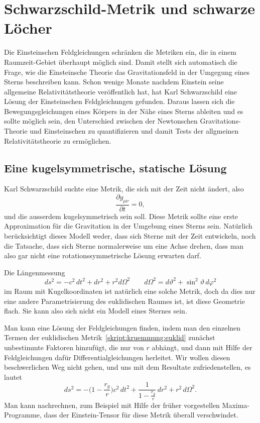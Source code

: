 %
%
%
\chapter{Schwarzschild-Metrik und schwarze Löcher%
\label{skript:chapter:schwarzschild}}
\rhead{}
Die Einsteinschen Feldgleichungen schränken die Metriken ein,
die in einem Raumzeit-Gebiet über\-haupt möglich sind.
Damit stellt sich automatisch die Frage, wie die Einsteinsche Theorie 
das Gravitationsfeld in der Umgegung eines Sterns beschreiben kann.
Schon wenige Monate nachdem Einstein seine allgemeine Relativitätstheorie
veröffentlich hat, hat Karl Schwarzschild eine Lösung der Einsteinschen
Feldgleichungen gefunden.
Daraus lassen sich die Bewegungsgleichungen eines Körpers in der Nähe
eines Sterns ableiten und es sollte möglich sein, den Unterschied zwischen
der Newtonschen Gravitations-Theorie und Einsteinschen  zu quantifizieren
und damit Tests der allgmeinen Relativitätstheorie zu ermöglichen.

\section{Eine kugelsymmetrische, statische Lösung}
Karl Schwarzschild suchte eine Metrik, die sich mit der Zeit nicht ändert,
also
\[
\frac{\partial g_{\mu\nu}}{\partial t}=0,
\]
und die ausserdem kugelsymmetrisch sein soll.
Diese Metrik sollte eine erste Approximation für die Gravitation in
der Umgebung eines Sterns sein.
Natürlich berücksichtigt dieses Modell weder, dass sich Sterne mit
der Zeit entwickeln, noch die Tatsache, dass sich Sterne normalerweise
um eine Achse drehen, dass man also gar nicht eine rotationssymmetrische
Lösung erwarten darf.

Die Längenmessung
\begin{equation}
ds^2
=
-c^2\,dt^2 + dr^2 + r^2 d\Omega^2
\qquad
d\Omega^2 = d\vartheta^2 + \sin^2\vartheta\,d\varphi^2
\label{skript:kruemmung:euklid}
\end{equation}
im Raum mit Kugelkoordinaten ist natürlich eine solche Metrik,
doch da dies nur eine andere Parametrisierung des euklidischen
Raumes ist, ist diese Geometrie flach.
Sie kann also sich nicht ein Modell eines Sternes sein.

Man kann eine Lösung der Feldgleichungen finden, indem man den
einzelnen Termen der euklidischen Metrik~\eqref{skript:kruemmung:euklid}
zunächst unbestimmte Faktoren hinzufügt, die nur von $r$ abhängt,
und dann mit Hilfe der Feldgleichungen dafür Differentialgleichungen
herleitet.
Wir wollen diesen beschwerlichen Weg nicht gehen, und uns mit dem
Resultate zufriedenstellen, es lautet
\begin{equation}
ds^2
=
-\biggl(1-\frac{r_g}r\biggr)c^2\,dt^2
+\frac1{\displaystyle 1-\frac{r_g}r}\,dr^2 + r^2\,d\Omega^2.
\label{skript:kruemmung:schwarzschildmetrik}
\end{equation}
Man kann nachrechnen, zum Beispiel mit Hilfe der früher vorgestellen
Maxima-Programme, dass der Einstein-Tensor für diese Metrik überall
verschwindet.

